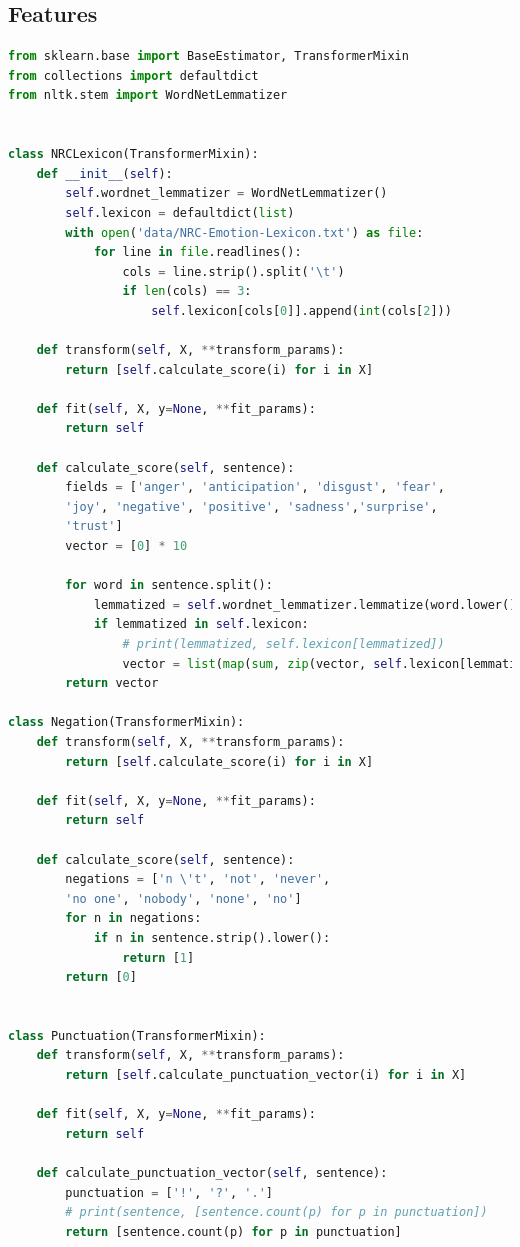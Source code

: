 \documentclass[11pt]{article}
\begin{document}
\subsection{Features}
\begin{lstlisting}[language=Python]
from sklearn.base import BaseEstimator, TransformerMixin
from collections import defaultdict
from nltk.stem import WordNetLemmatizer


class NRCLexicon(TransformerMixin):
    def __init__(self):
        self.wordnet_lemmatizer = WordNetLemmatizer()
        self.lexicon = defaultdict(list)
        with open('data/NRC-Emotion-Lexicon.txt') as file:
            for line in file.readlines():
                cols = line.strip().split('\t')
                if len(cols) == 3:
                    self.lexicon[cols[0]].append(int(cols[2]))

    def transform(self, X, **transform_params):
        return [self.calculate_score(i) for i in X]

    def fit(self, X, y=None, **fit_params):
        return self

    def calculate_score(self, sentence):
        fields = ['anger', 'anticipation', 'disgust', 'fear',
        'joy', 'negative', 'positive', 'sadness','surprise',
        'trust']
        vector = [0] * 10

        for word in sentence.split():
            lemmatized = self.wordnet_lemmatizer.lemmatize(word.lower())
            if lemmatized in self.lexicon:
                # print(lemmatized, self.lexicon[lemmatized])
                vector = list(map(sum, zip(vector, self.lexicon[lemmatized])))
        return vector

class Negation(TransformerMixin):
    def transform(self, X, **transform_params):
        return [self.calculate_score(i) for i in X]

    def fit(self, X, y=None, **fit_params):
        return self

    def calculate_score(self, sentence):
        negations = ['n \'t', 'not', 'never', 
        'no one', 'nobody', 'none', 'no']
        for n in negations:
            if n in sentence.strip().lower():
                return [1]
        return [0]


class Punctuation(TransformerMixin):
    def transform(self, X, **transform_params):
        return [self.calculate_punctuation_vector(i) for i in X]

    def fit(self, X, y=None, **fit_params):
        return self

    def calculate_punctuation_vector(self, sentence):
        punctuation = ['!', '?', '.']
        # print(sentence, [sentence.count(p) for p in punctuation])
        return [sentence.count(p) for p in punctuation]
\end{lstlisting}
\end{document}
